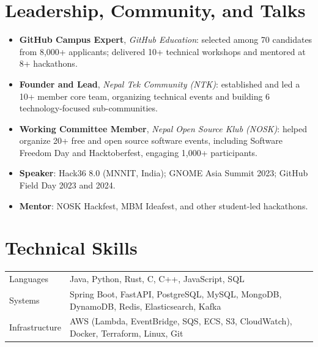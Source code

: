 \documentclass[11pt,letterpaper]{article}
\begin{document}
\section{Leadership, Community, and Talks}
\begin{itemize}
  \item \textbf{GitHub Campus Expert}, \textit{GitHub Education}: selected among 70 candidates from
        8,000+ applicants; delivered 10+ technical workshops and mentored at 8+ hackathons.
  \item \textbf{Founder and Lead}, \textit{Nepal Tek Community (NTK)}: established and led a 10+ member
        core team, organizing technical events and building 6 technology-focused sub-communities.
  \item \textbf{Working Committee Member}, \textit{Nepal Open Source Klub (NOSK)}: helped organize 20+
        free and open source software events, including Software Freedom Day and Hacktoberfest,
        engaging 1,000+ participants.
  \item \textbf{Speaker}: Hack36 8.0 (MNNIT, India); GNOME Asia Summit 2023; GitHub Field Day 2023 and 2024.
  \item \textbf{Mentor}: NOSK Hackfest, MBM Ideafest, and other student-led hackathons.
\end{itemize}

\section{Technical Skills}
\begin{tabular}{@{}p{}@{}p{}@{}}
  Languages      & Java, Python, Rust, C, C++, JavaScript, SQL \\
  Systems        & Spring Boot, FastAPI, PostgreSQL, MySQL, MongoDB, DynamoDB, Redis, Elasticsearch, Kafka \\
  Infrastructure & AWS (Lambda, EventBridge, SQS, ECS, S3, CloudWatch), Docker, Terraform, Linux, Git
\end{tabular}
\end{document}
